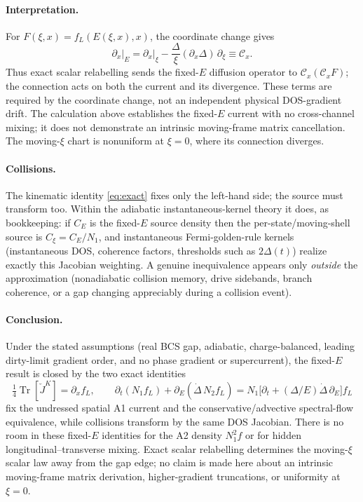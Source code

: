 \documentclass[
  aps,
  prb,
  preprint,
  superscriptaddress,
  longbibliography,
  nofootinbib
]{revtex4-2}
\newcommand{\Tr}{\operatorname{Tr}}
\newcommand{\DOS}{N_1}
\newcommand{\fL}{f_L}
\begin{document}
\paragraph{Interpretation.} For
$F(\xi,x)=\fL(E(\xi,x),x)$, the coordinate change gives
\[
  \partial_x\big|_E
  =
  \partial_x\big|_\xi
  -\frac{\Delta}{\xi}(\partial_x\Delta)\,\partial_\xi
  \equiv\mathcal C_x .
\]
Thus exact scalar relabelling sends the fixed-$E$ diffusion operator to
$\mathcal C_x(\mathcal C_xF)$; the connection acts on both the current and
its divergence. These terms are required by the coordinate change, not an
independent physical DOS-gradient drift. The calculation above establishes
the fixed-$E$ current with no cross-channel mixing; it does not demonstrate
an intrinsic moving-frame matrix cancellation. The moving-$\xi$ chart is
nonuniform at $\xi=0$, where its connection diverges.

\paragraph{Collisions.} The kinematic identity \cref{eq:exact} fixes only the
left-hand side; the source must transform too. Within the adiabatic
instantaneous-kernel theory it does, as bookkeeping: if $C_E$ is the fixed-$E$
source density then the per-state/moving-shell source is $C_\xi=C_E/\DOS$, and
instantaneous Fermi-golden-rule kernels (instantaneous DOS, coherence factors,
thresholds such as $2\Delta(t)$) realize exactly this Jacobian weighting. A
genuine inequivalence appears only \emph{outside} the approximation
(nonadiabatic collision memory, drive sidebands, branch coherence, or a gap
changing appreciably during a collision event).

\paragraph{Conclusion.} Under the stated assumptions (real BCS gap,
adiabatic, charge-balanced, leading dirty-limit gradient order, and no phase
gradient or supercurrent), the fixed-$E$ result is closed by the two exact
identities
\begin{equation}
  \tfrac14\Tr[\check J^{K}]=\partial_x\fL,
  \qquad
  \partial_t(\DOS\fL)+\partial_E(\dot\Delta\,N_2\fL)
  =\DOS\big[\partial_t+(\Delta/E)\dot\Delta\,\partial_E\big]\fL
\end{equation}
fix the undressed spatial A1 current and the conservative/advective
spectral-flow equivalence, while collisions transform by the same DOS
Jacobian. There is no room in these fixed-$E$ identities for the A2 density
$\DOS^2 f$ or for hidden longitudinal--transverse mixing. Exact scalar
relabelling determines the moving-$\xi$ scalar law away from the gap edge;
no claim is made here about an intrinsic moving-frame matrix derivation,
higher-gradient truncations, or uniformity at $\xi=0$.
\end{document}

